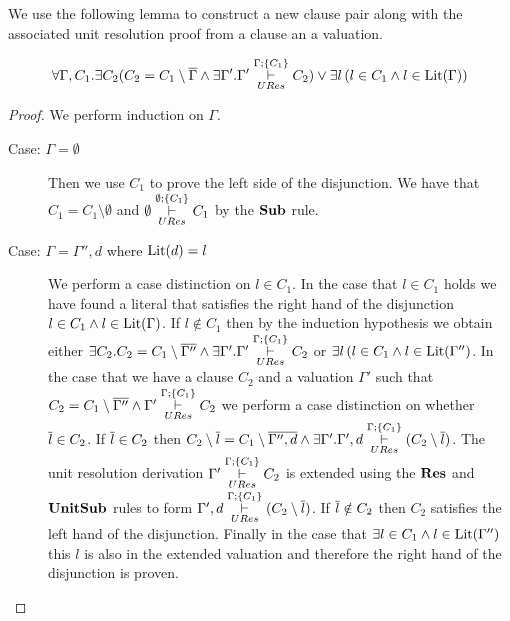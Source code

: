 We use the following lemma to construct a new clause pair along with the associated unit resolution proof from a clause an a valuation.

\begin{mylemma}\label{lem:compgen1}
\begin{align*}
\forall \Gamma, C_1. \exists C_2( C_2 = C_1 \setminus \overline{\Gamma} \wedge \exists \Gamma' . \Gamma' \overset{\Gamma;\{C_1 \}}{\underset{URes}{\vdash}} C_2) \vee \exists l\, (l \in C_1 \wedge l \in \mathrm{Lit}(\Gamma))
\end{align*}
\begin{proof}
We perform induction on $\Gamma$.
\begin{description}
\item[Case: $\Gamma = \emptyset$] Then we use $C_1$ to prove the left side of the disjunction. We have that $C_1 = C_1 \setminus \emptyset$ and $\emptyset \overset{\emptyset;\{C_1 \}}{\underset{URes}{\vdash}} C_1$ by the $\mathbf{Sub}$ rule.
\item[Case: $\Gamma = \Gamma'', d$ where $\mathrm{Lit}(d) = l$]
We perform a case distinction on $l \in C_1$. In the case that $l \in C_1$ holds we have found a literal that satisfies the right hand of the disjunction $l \in C_1 \wedge l \in \mathrm{Lit}(\Gamma)$. If $l \notin C_1$ then by the induction hypothesis we obtain either $\exists C_2. C_2 = C_1 \setminus \overline{\Gamma''} \wedge \exists \Gamma' . \Gamma' \overset{\Gamma;\{C_1 \}}{\underset{URes}{\vdash}} C_2$  or $\exists l\, (l \in C_1 \wedge l \in \mathrm{Lit}(\Gamma'')$. In the case that we have a clause $C_2$ and a valuation $\Gamma'$ such that $C_2 = C_1 \setminus \overline{\Gamma''} \wedge  \Gamma' \overset{\Gamma;\{C_1 \}}{\underset{URes}{\vdash}} C_2$ we perform a case distinction on whether $\overline{l} \in C_2$. If $\overline{l} \in C_2$ then $C_2\setminus \overline{l} = C_1 \setminus \overline{\Gamma'', d} \wedge \exists \Gamma' . \Gamma',d  \overset{\Gamma;\{C_1 \}}{\underset{URes}{\vdash}} (C_2 \setminus \overline{l})$. The unit resolution derivation $ \Gamma' \overset{\Gamma;\{C_1 \}}{\underset{URes}{\vdash}} C_2$  is extended using the $\mathbf{Res}$ and $\mathbf{UnitSub}$ rules to form  $\Gamma',d  \overset{\Gamma;\{C_1 \}}{\underset{URes}{\vdash}} (C_2 \setminus \overline{l}) $. If $\overline{l} \notin C_2$ then $C_2$ satisfies the left hand of the disjunction. Finally in the case that $\exists l \in C_1 \wedge l \in \mathrm{Lit}(\Gamma'')$  this $l$ is also in the extended valuation and therefore the right hand of the disjunction is proven.

\begin{comment}
We perform a case distinction on whether $l \in \lit(\Gamma)$ if it is then we have found a literal  such that $l \in C_1 \wedge l \in \lit(\Gamma)$. If $l \notin \lit{\Gamma}$ by the induction hypothesis we obtain $\exists C_4. C_4 = C_3 \setminus \mybar{\Gamma} \wedge \exists \Gamma'. \, \Gamma'  \clmodres{\Gamma}{\{ C_3 \}} C_4  \vee  \exists l \, (l \in C_3 \wedge l \in \lit{\Gamma})$. Leading to two further cases. In the case that  the left hand of the disjunction holds we then perform a case distinction on whether $\mybar{l} \in \Gamma$
\end{comment}

\end{description}
\end{proof}
\end{mylemma}
